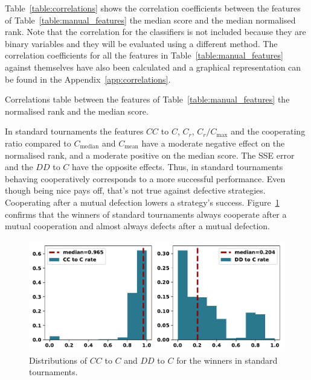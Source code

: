 \documentclass{article}
\begin{document}
Table~\ref{table:correlations} shows the correlation coefficients between the
features of Table~\ref{table:manual_features} the median score and the median
normalised rank. Note that the correlation for the classifiers is
not included because they are binary variables and they will be evaluated using a
different method. The correlation coefficients for all the features in
Table~\ref{table:manual_features} against themselves have also been calculated and a
graphical representation can be found in the Appendix~\ref{app:correlations}.

\begin{table}[!htbp]
    \begin{center}
    \resizebox{.9\textwidth}{!}{
        
    }
\end{center}
\caption{Correlations table between the features of Table~\ref{table:manual_features}
the normalised rank and the median score.}\label{table:correlations}
\end{table}

In standard tournaments the features  $CC$ to $C$, $C_r$, $C_r / C_{\text{max}}$
and the cooperating ratio compared to $C_{\text{median}}$ and $C_{\text{mean}}$
have a moderate negative effect on the normalised rank, and a moderate positive
on the median score. The SSE error and the $DD$ to $C$ have the opposite
effects. Thus, in standard tournaments behaving cooperatively corresponds to a
more successful performance. Even though being nice pays off,
that's not true against defective strategies. Cooperating after a mutual
defection lowers a strategy's success.
Figure~\ref{fig:rates_of_winners_in_standard_tournaments} confirms that the
winners of standard tournaments always cooperate after a mutual cooperation and
almost always defects after a mutual defection.

\begin{figure}[!htbp]
    \centering
    \includegraphics[width=.65\textwidth]{../images/rates_of_winners_in_standard_tournaments.pdf}
    \caption{Distributions of $CC$ to $C$ and $DD$ to $C$ for the winners in
    standard tournaments.}\label{fig:rates_of_winners_in_standard_tournaments}
\end{figure}
\end{document}
